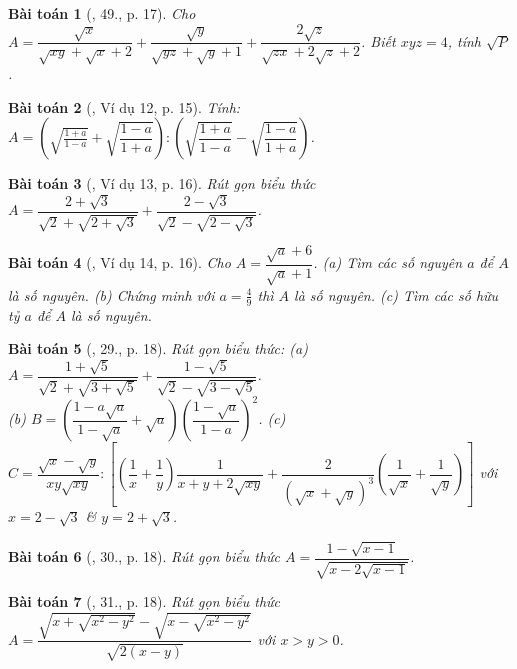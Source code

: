 \documentclass{article}
\newtheorem{baitoan}{Bài toán}
\begin{document}
\begin{baitoan}[\cite{Tuyen_Toan_9}, 49., p. 17]
	Cho $A = \dfrac{\sqrt{x}}{\sqrt{xy} + \sqrt{x} + 2} + \dfrac{\sqrt{y}}{\sqrt{yz} + \sqrt{y} + 1} + \dfrac{2\sqrt{z}}{\sqrt{zx} + 2\sqrt{z} + 2}$. Biết $xyz = 4$, tính $\sqrt{P}$.
\end{baitoan}

\begin{baitoan}[\cite{Binh_Toan_9_tap_1}, Ví dụ 12, p. 15]
	Tính: $A = \left(\sqrt{\frac{1 + a}{1 - a}} + \sqrt{\dfrac{1 - a}{1 + a}}\right):\left(\sqrt{\dfrac{1 + a}{1 - a}} - \sqrt{\dfrac{1 - a}{1 + a}}\right)$.
\end{baitoan}

\begin{baitoan}[\cite{Binh_Toan_9_tap_1}, Ví dụ 13, p. 16]
	Rút gọn biểu thức $A = \dfrac{2 + \sqrt{3}}{\sqrt{2} + \sqrt{2 + \sqrt{3}}} + \dfrac{2 - \sqrt{3}}{\sqrt{2} - \sqrt{2 - \sqrt{3}}}$.
\end{baitoan}

\begin{baitoan}[\cite{Binh_Toan_9_tap_1}, Ví dụ 14, p. 16]
	Cho $A = \dfrac{\sqrt{a} + 6}{\sqrt{a} + 1}$. (a) Tìm các số nguyên $a$ để $A$ là số nguyên. (b) Chứng minh với $a = \frac{4}{9}$ thì $A$ là số nguyên. (c) Tìm các số hữu tỷ $a$ để $A$ là số nguyên.
\end{baitoan}

\begin{baitoan}[\cite{Binh_Toan_9_tap_1}, 29., p. 18]
	Rút gọn biểu thức: (a) $A = \dfrac{1 + \sqrt{5}}{\sqrt{2} + \sqrt{3 + \sqrt{5}}} + \dfrac{1 - \sqrt{5}}{\sqrt{2} - \sqrt{3 - \sqrt{5}}}$.\\(b) $B = \left(\dfrac{1 - a\sqrt{a}}{1 - \sqrt{a}} + \sqrt{a}\right)\left(\dfrac{1 - \sqrt{a}}{1 - a}\right)^2$. (c) $C = \dfrac{\sqrt{x} - \sqrt{y}}{xy\sqrt{xy}}:\left[\left(\dfrac{1}{x} + \dfrac{1}{y}\right)\dfrac{1}{x + y+ 2\sqrt{xy}} + \dfrac{2}{(\sqrt{x} + \sqrt{y})^3}\left(\dfrac{1}{\sqrt{x}} + \dfrac{1}{\sqrt{y}}\right)\right]$ với $x = 2 - \sqrt{3}$ \& $y = 2 + \sqrt{3}$.
\end{baitoan}

\begin{baitoan}[\cite{Binh_Toan_9_tap_1}, 30., p. 18]
	Rút gọn biểu thức $A = \dfrac{1 - \sqrt{x - 1}}{\sqrt{x - 2\sqrt{x - 1}}}$.
\end{baitoan}

\begin{baitoan}[\cite{Binh_Toan_9_tap_1}, 31., p. 18]
	Rút gọn biểu thức $A = \dfrac{\sqrt{x + \sqrt{x^2 - y^2}} - \sqrt{x - \sqrt{x^2 - y^2}}}{\sqrt{2(x - y)}}$ với $x > y > 0$.
\end{baitoan}
\end{document}
